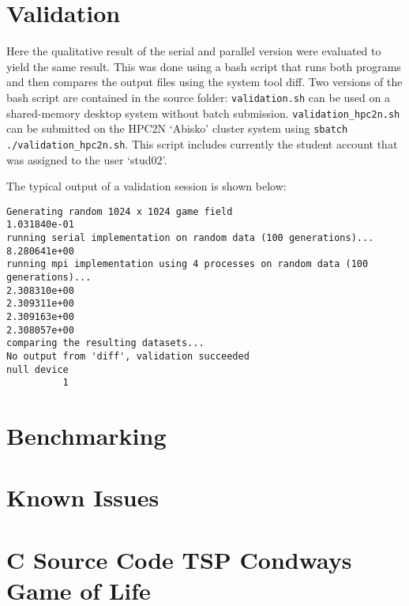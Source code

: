 \documentclass[a4paper,11pt,twoside]{article}
\begin{document}
\section{Validation}
Here the qualitative result of the serial and parallel version were evaluated to yield the same result. This was done using a bash script that runs both programs and then compares the output files using the system tool diff. Two versions of the bash script are contained in the source folder: \verb+validation.sh+ can be used on a shared-memory desktop system without batch submission. \verb+validation_hpc2n.sh+ can be submitted on the HPC2N `Abisko' cluster system using \verb+sbatch ./validation_hpc2n.sh+. This script includes currently the student account that was assigned to the user `stud02'.

The typical output of a validation session is shown below:
\begin{verbatim}
Generating random 1024 x 1024 game field
1.031840e-01
running serial implementation on random data (100 generations)...
8.280641e+00
running mpi implementation using 4 processes on random data (100 generations)...
2.308310e+00
2.309311e+00
2.309163e+00
2.308057e+00
comparing the resulting datasets...
No output from 'diff', validation succeeded
null device 
          1 
\end{verbatim}

\section{Benchmarking}

\section{Known Issues}



\appendix
\section{C Source Code TSP Condways Game of Life}{\label{app:gol}}
\end{document}
